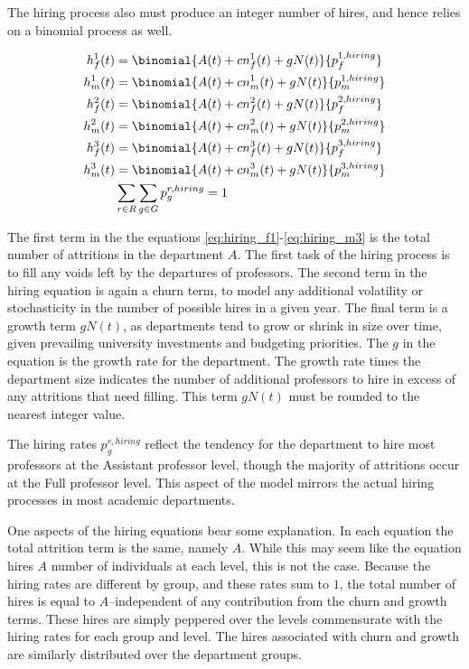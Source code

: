 \documentclass[12pt, a4paper, oneside, headinclude, footinclude,english]{article}
\begin{document}
The hiring process also must produce an integer number of hires, and hence
relies on a binomial process as well.


\begin{align}
  h^1_f(t) &= \binomial{A(t) + cn^1_f(t) + gN(t)}{p^{1, hiring}_f}  \label{eq:hiring_f1}\\
  h^1_m(t) &= \binomial{A(t) + cn^1_m(t) + gN(t)}{p^{1, hiring}_m}  \label{eq:hiring_m1}\\
  h^2_f(t) &= \binomial{A(t) + cn^2_f(t) + gN(t)}{p^{2, hiring}_f}  \label{eq:hiring_f2}\\
  h^2_m(t) &= \binomial{A(t) + cn^2_m(t) + gN(t)}{p^{2, hiring}_m}  \label{eq:hiring_m2}\\
  h^3_f(t) &= \binomial{A(t) + cn^3_f(t) + gN(t)}{p^{3, hiring}_f}  \label{eq:hiring_f3}\\
  h^3_m(t) &= \binomial{A(t) + cn^3_m(t) + gN(t)}{p^{3, hiring}_m}  \label{eq:hiring_m3}\\
  &\sum_{r \in R}\sum_{g \in G}p_g^{r, hiring} = 1 \label{eq:hiring_constraint}
\end{align}

The first term in the the equations \ref{eq:hiring_f1}-\ref{eq:hiring_m3} is the
total number of attritions in the department $A$. The first task of the hiring
process is to fill any voids left by the departures of professors. The second
term in the hiring equation is again a churn term, to model any additional
volatility or stochasticity in the number of possible hires in a given year. The
final term is a growth term $gN(t)$, as departments tend to grow or shrink in
size over time, given prevailing university investments and budgeting
priorities. The $g$ in the equation is the growth rate for the department. The
growth rate times the department size indicates the number of additional
professors to hire in excess of any attritions that need filling. This term
$gN(t)$ must be rounded to the nearest integer value.

The hiring rates $p^{r, hiring}_g$ reflect the tendency for the department to
hire most professors at the Assistant professor level, though the majority of
attritions occur at the Full professor level. This aspect of the model mirrors
the actual hiring processes in most academic departments.

One aspects of the hiring equations bear some explanation. In each equation the
total attrition term is the same, namely $A$. While this may seem like the
equation hires $A$ number of individuals at each level, this is not the case.
Because the hiring rates are different by group, and these rates sum to $1$, the
total number of hires is equal to $A$--independent of any contribution from the
churn and growth terms. These hires are simply peppered over the levels
commensurate with the hiring rates for each group and level. The hires
associated with churn and growth are similarly distributed over the department
groups. 
\end{document}
